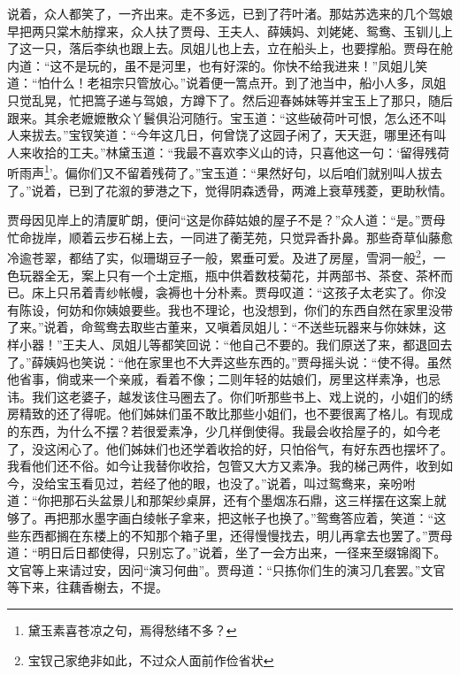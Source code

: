 \documentclass[12pt,oneside]{book}
\begin{document}
说着，众人都笑了，一齐出来。走不多远，已到了荇叶渚。那姑苏选来的几个驾娘早把两只棠木舫撑来，众人扶了贾母、王夫人、薛姨妈、刘姥姥、鸳鸯、玉钏儿上了这一只，落后李纨也跟上去。凤姐儿也上去，立在船头上，也要撑船。贾母在舱内道：“这不是玩的，虽不是河里，也有好深的。你快不给我进来！”凤姐儿笑道：“怕什么！老祖宗只管放心。”说着便一篙点开。到了池当中，船小人多，凤姐只觉乱晃，忙把篙子递与驾娘，方蹲下了。然后迎春姊妹等并宝玉上了那只，随后跟来。其余老嬷嬷散众丫鬟俱沿河随行。宝玉道：“这些破荷叶可恨，怎么还不叫人来拔去。”宝钗笑道：“今年这几日，何曾饶了这园子闲了，天天逛，哪里还有叫人来收拾的工夫。”林黛玉道：“我最不喜欢李义山的诗，只喜他这一句：‘留得残荷听雨声\footnote{黛玉素喜苍凉之句，焉得愁绪不多？}’。偏你们又不留着残荷了。”宝玉道：“果然好句，以后咱们就别叫人拔去了。”说着，已到了花溆的萝港之下，觉得阴森透骨，两滩上衰草残菱，更助秋情。

贾母因见岸上的清厦旷朗，便问“这是你薛姑娘的屋子不是？”众人道：“是。”贾母忙命拢岸，顺着云步石梯上去，一同进了蘅芜苑，只觉异香扑鼻。那些奇草仙藤愈冷逾苍翠，都结了实，似珊瑚豆子一般，累垂可爱。及进了房屋，雪洞一般\footnote{宝钗己家绝非如此，不过众人面前作俭省状}，一色玩器全无，案上只有一个土定瓶，瓶中供着数枝菊花，并两部书、茶奁、茶杯而已。床上只吊着青纱帐幔，衾褥也十分朴素。贾母叹道：“这孩子太老实了。你没有陈设，何妨和你姨娘要些。我也不理论，也没想到，你们的东西自然在家里没带了来。”说着，命鸳鸯去取些古董来，又嗔着凤姐儿：“不送些玩器来与你妹妹，这样小器！”王夫人、凤姐儿等都笑回说：“他自己不要的。我们原送了来，都退回去了。”薛姨妈也笑说：“他在家里也不大弄这些东西的。”贾母摇头说：“使不得。虽然他省事，倘或来一个亲戚，看着不像；二则年轻的姑娘们，房里这样素净，也忌讳。我们这老婆子，越发该住马圈去了。你们听那些书上、戏上说的，小姐们的绣房精致的还了得呢。他们姊妹们虽不敢比那些小姐们，也不要很离了格儿。有现成的东西，为什么不摆？若很爱素净，少几样倒使得。我最会收拾屋子的，如今老了，没这闲心了。他们姊妹们也还学着收拾的好，只怕俗气，有好东西也摆坏了。我看他们还不俗。如今让我替你收拾，包管又大方又素净。我的梯己两件，收到如今，没给宝玉看见过，若经了他的眼，也没了。”说着，叫过鸳鸯来，亲吩咐道：“你把那石头盆景儿和那架纱桌屏，还有个墨烟冻石鼎，这三样摆在这案上就够了。再把那水墨字画白绫帐子拿来，把这帐子也换了。”鸳鸯答应着，笑道：“这些东西都搁在东楼上的不知那个箱子里，还得慢慢找去，明儿再拿去也罢了。”贾母道：“明日后日都使得，只别忘了。”说着，坐了一会方出来，一径来至缀锦阁下。文官等上来请过安，因问“演习何曲”。贾母道：“只拣你们生的演习几套罢。”文官等下来，往藕香榭去，不提。
\end{document}
